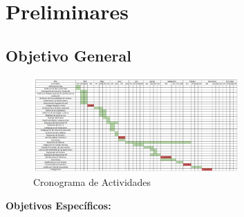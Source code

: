 \chapter{Preliminares}\label{chapter04}

\section{Objetivo General}

\begin{figure}[h]
    \centering
    \includegraphics[width=0.7\textwidth]{images/cronograma.png}
    \caption{Cronograma de Actividades}
    \label{fig:cronograma}
\end{figure}
\noindent\textbf{Objetivos Específicos:}